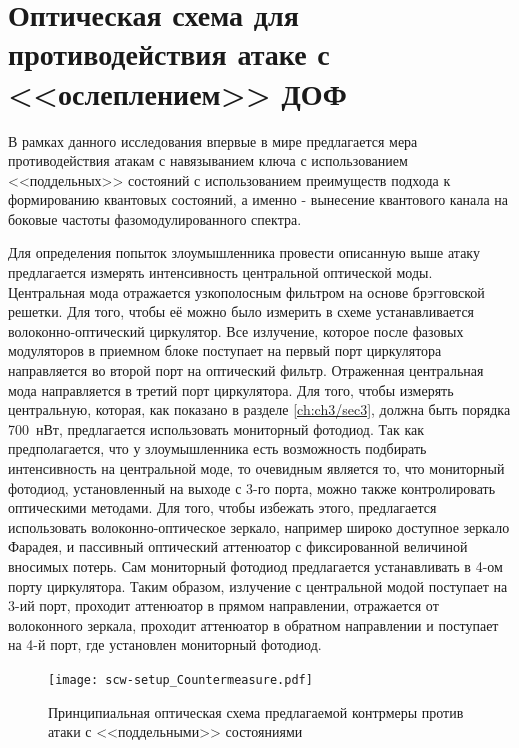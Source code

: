 \section{Оптическая схема для противодействия атаке с <<ослеплением>> ДОФ} \label{ch:ch3/sec4}

В рамках данного исследования впервые в мире предлагается мера противодействия атакам с навязыванием ключа с использованием <<поддельных>> состояний с использованием преимуществ подхода к формированию квантовых состояний, а именно - вынесение квантового канала на боковые частоты фазомодулированного спектра.

Для определения попыток злоумышленника провести описанную выше атаку предлагается измерять интенсивность центральной оптической моды. Центральная мода отражается узкополосным фильтром на основе брэгговской решетки. Для того, чтобы её можно было измерить в схеме устанавливается волоконно-оптический циркулятор. Все излучение, которое после фазовых модуляторов в приемном блоке поступает на первый порт циркулятора направляется во второй порт на оптический фильтр. Отраженная центральная мода направляется в третий порт циркулятора. Для того, чтобы измерять центральную, которая, как показано в разделе \ref{ch:ch3/sec3}, должна быть порядка 700~нВт, предлагается использовать мониторный фотодиод. Так как предполагается, что у злоумышленника есть возможность подбирать интенсивность на центральной моде, то очевидным является то, что мониторный фотодиод, установленный на выходе с 3-го порта, можно также контролировать оптическими методами. Для того, чтобы избежать этого, предлагается использовать волоконно-оптическое зеркало, например широко доступное зеркало Фарадея, и пассивный оптический аттенюатор с фиксированной величиной вносимых потерь. Сам мониторный фотодиод предлагается устанавливать в 4-ом порту циркулятора. Таким образом, излучение с центральной модой поступает на 3-ий порт, проходит аттенюатор в прямом направлении, отражается от волоконного зеркала, проходит аттенюатор в обратном направлении и поступает на 4-й порт, где установлен мониторный фотодиод.         
 \begin{figure}[ht]
  \centering
  \texttt{[image: scw-setup\_Countermeasure.pdf]}
  \caption{Принципиальная оптическая схема предлагаемой контрмеры против атаки с <<поддельными>> состояниями}
  \label{fig:countermeasure}
\end{figure}

\pagebreak

